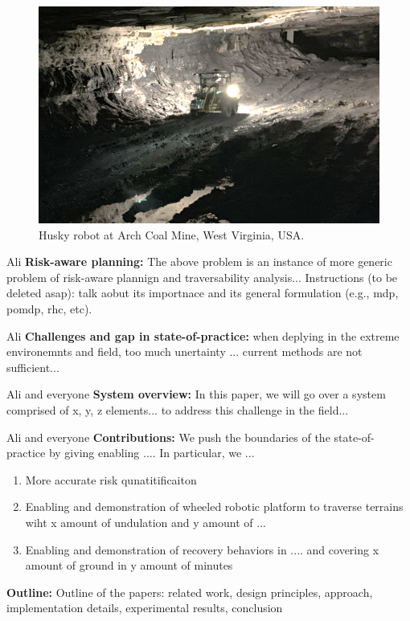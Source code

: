 \documentclass[letterpaper, 10 pt, conference]{ieeeconf}  %
\newcommand{\pr}[1]{\textbf{#1:}}  %
\newcommand{\ph}[1]{\pr{#1}} %
\newcommand{\todo}[1]{{\color{red} #1 }} %
\newcommand{\inst}[1]{{\color{orange} Instructions (to be deleted asap): #1 }} %
\begin{document}
\begin{figure}[t!]
    \centering
    \includegraphics[width=\linewidth]{Traversability/figs/HuskyArch.png}
    \caption{Husky robot at Arch Coal Mine, West Virginia, USA.}
    \label{fig:HuskyArch}
\end{figure}

\todo{Ali} \ph{Risk-aware planning} The above problem is an instance of more generic problem of risk-aware plannign and traversability analysis... \inst{talk aobut its importnace and its general formulation (e.g., mdp, pomdp, rhc, etc).}

\todo{Ali} \ph{Challenges and gap in state-of-practice}
when deplying in the extreme environemnts and field, too much unertainty ... current methods are not sufficient...

\todo{Ali and everyone} \ph{System overview}
In this paper, we will go over a system comprised of x, y, z elements... to address this challenge in the field...

\todo{Ali and everyone} \ph{Contributions}
We push the boundaries of the state-of-practice by giving enabling .... In particular, we ...
\begin{enumerate}
    \item More accurate risk qunatitificaiton
    \item Enabling and demonstration of wheeled robotic platform to traverse terrains wiht x amount of undulation and y amount of ...
    \item Enabling and demonstration of recovery behaviors in .... and covering x amount of ground in y amount of minutes
\end{enumerate}

\ph{Outline}
Outline of the papers: related work, design principles, approach, implementation details, experimental results, conclusion
\end{document}
